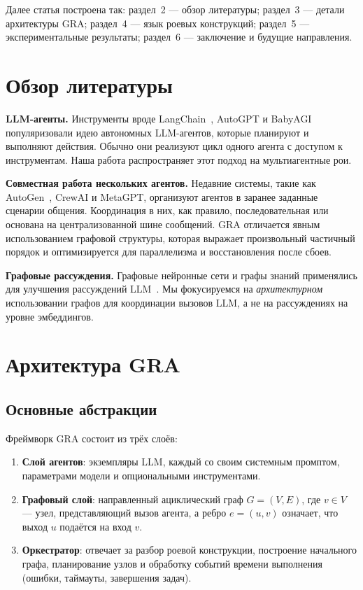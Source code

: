 \documentclass[11pt]{article}
\begin{document}
Далее статья построена так: раздел~2 — обзор литературы; раздел~3 — детали архитектуры GRA; раздел~4 — язык роевых конструкций; раздел~5 — экспериментальные результаты; раздел~6 — заключение и будущие направления.

\section{Обзор литературы}
\textbf{LLM-агенты.} Инструменты вроде LangChain~\cite{langchain}, AutoGPT и BabyAGI популяризовали идею автономных LLM-агентов, которые планируют и выполняют действия.
Обычно они реализуют цикл одного агента с доступом к инструментам.
Наша работа распространяет этот подход на мультиагентные рои.

\textbf{Совместная работа нескольких агентов.} Недавние системы, такие как AutoGen~\cite{autogen}, CrewAI и MetaGPT, организуют агентов в заранее заданные сценарии общения.
Координация в них, как правило, последовательная или основана на централизованной шине сообщений.
GRA отличается явным использованием графовой структуры, которая выражает произвольный частичный порядок и оптимизируется для параллелизма и восстановления после сбоев.

\textbf{Графовые рассуждения.} Графовые нейронные сети и графы знаний применялись для улучшения рассуждений LLM~\cite{yasunaga2021qa}.
Мы фокусируемся на \emph{архитектурном} использовании графов для координации вызовов LLM, а не на рассуждениях на уровне эмбеддингов.

\section{Архитектура GRA}
\subsection{Основные абстракции}
Фреймворк GRA состоит из трёх слоёв:
\begin{enumerate}
    \item \textbf{Слой агентов}: экземпляры LLM, каждый со своим системным промптом, параметрами модели и опциональными инструментами.
    \item \textbf{Графовый слой}: направленный ациклический граф $G=(V,E)$, где $v \in V$ — узел, представляющий вызов агента, а ребро $e = (u,v)$ означает, что выход $u$ подаётся на вход $v$.
    \item \textbf{Оркестратор}: отвечает за разбор роевой конструкции, построение начального графа, планирование узлов и обработку событий времени выполнения (ошибки, таймауты, завершения задач).
\end{enumerate}
\end{document}
